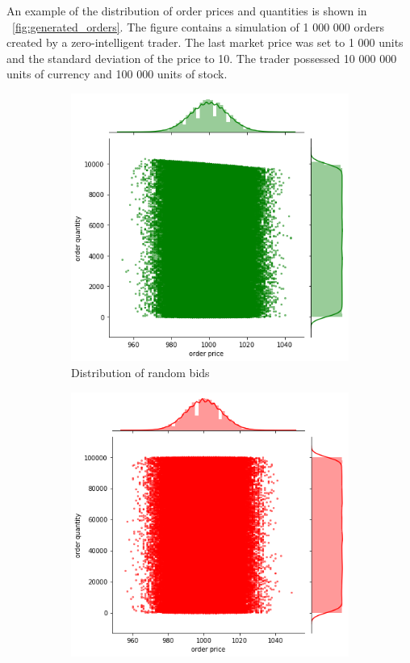 
An example of the distribution of order prices and quantities
is shown in ~\ref{fig:generated_orders}. The figure contains a simulation 
of 1 000 000 orders created by a zero-intelligent trader. 
The last market price was set to 1 000 units and the standard deviation of the price to 10. 
The trader possessed 10 000 000 units of currency and 100 000 
units of stock.

\begin{figure}[H]
    \centering
    \begin{subfigure}{.5\textwidth}
      \centering
      \includegraphics[width=\linewidth]{plots/order_distr_bid.png}
      \caption{Distribution of random bids}
      \label{fig:gener_bids}
    \end{subfigure}%
    \begin{subfigure}{.5\textwidth}
      \centering
      \includegraphics[width=\linewidth]{plots/order_distr_ask.png}

\end{subfigure}
\end{figure}
